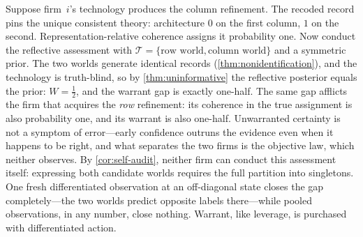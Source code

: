\begin{excont}
Suppose firm~$i$'s technology produces the column refinement.  The recoded
record pins the unique consistent theory: architecture $0$ on the first
column, $1$ on the second.  Representation-relative coherence assigns it
probability one.  Now conduct the reflective assessment with
$\mathcal T=\{\text{row world},\text{column world}\}$ and a symmetric prior.
The two worlds generate identical records
(\cref{thm:nonidentification}), and the technology is truth-blind, so by
\cref{thm:uninformative} the reflective posterior equals the prior:
$W=\tfrac12$, and the warrant gap is exactly one-half.  The same gap
afflicts the firm that acquires the \emph{row} refinement: its coherence in
the true assignment is also probability one, and its warrant is also
one-half.  Unwarranted certainty is not a symptom of error---early
confidence outruns the evidence even when it happens to be right, and what
separates the two firms is the objective law, which neither observes.  By
\cref{cor:self-audit}, neither firm can conduct this assessment itself:
expressing both candidate worlds requires the full partition into
singletons.  One fresh differentiated observation at an off-diagonal state
closes the gap completely---the two worlds predict opposite labels
there---while pooled observations, in any number, close nothing.  Warrant,
like leverage, is purchased with differentiated action.
\end{excont}
